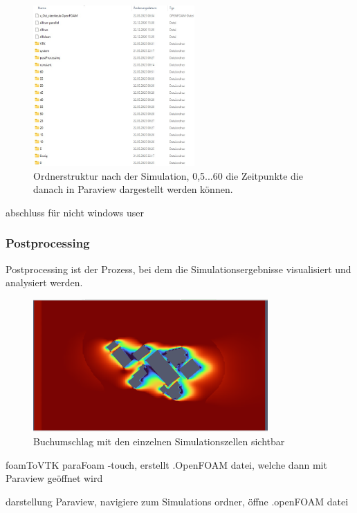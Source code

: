 \begin{figure}
    \centering
    \includegraphics[width=0.55\textwidth]{papers/openfoam/Bilder/Ordnerstruktur_Simuliert.jpg}
    \caption{Ordnerstruktur nach der Simulation, 0,5...60 die Zeitpunkte die danach in Paraview dargestellt werden können.}
    \label{fig:ordStrktSim}
\end{figure}




abschluss für nicht windows user



\subsubsection{Postprocessing}
Postprocessing ist der Prozess, bei dem die Simulationsergebnisse visualisiert und analysiert werden. 

\begin{figure}
    \centering
    \includegraphics[width=0.8\textwidth]{papers/openfoam/Bilder/vorschlag_Wind_Westen_10m_blocky.png}
    \caption{Buchumschlag mit den einzelnen Simulationszellen sichtbar}
    \label{fig:vorschWindWestBlocky}
\end{figure}



foamToVTK
paraFoam -touch, erstellt .OpenFOAM datei, welche dann mit Paraview geöffnet wird

darstellung
Paraview, navigiere zum Simulations ordner, öffne .openFOAM datei

